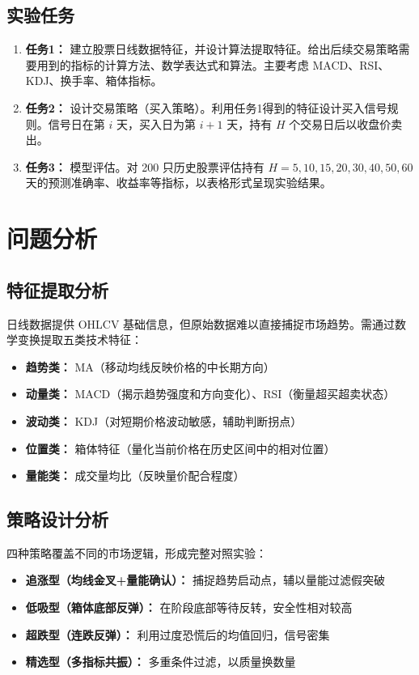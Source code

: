 \documentclass[12pt,a4paper]{ctexart}
\numberwithin{figure}{section}
\numberwithin{table}{section}
\begin{document}
\subsection{实验任务}
\begin{enumerate}[leftmargin=*]
    \item {\bfseries 任务1：} 建立股票日线数据特征，并设计算法提取特征。给出后续交易策略需要用到的指标的计算方法、数学表达式和算法。主要考虑 MACD、RSI、KDJ、换手率、箱体指标。
    \item {\bfseries 任务2：} 设计交易策略（买入策略）。利用任务1得到的特征设计买入信号规则。信号日在第 $i$ 天，买入日为第 $i+1$ 天，持有 $H$ 个交易日后以收盘价卖出。
    \item {\bfseries 任务3：} 模型评估。对 200 只历史股票评估持有 $H=5,10,15,20,30,40,50,60$ 天的预测准确率、收益率等指标，以表格形式呈现实验结果。
\end{enumerate}

\section{问题分析}

\subsection{特征提取分析}
日线数据提供 OHLCV 基础信息，但原始数据难以直接捕捉市场趋势。需通过数学变换提取五类技术特征：
\begin{itemize}[leftmargin=*]
    \item {\bfseries 趋势类：} MA（移动均线反映价格的中长期方向）
    \item {\bfseries 动量类：} MACD（揭示趋势强度和方向变化）、RSI（衡量超买超卖状态）
    \item {\bfseries 波动类：} KDJ（对短期价格波动敏感，辅助判断拐点）
    \item {\bfseries 位置类：} 箱体特征（量化当前价格在历史区间中的相对位置）
    \item {\bfseries 量能类：} 成交量均比（反映量价配合程度）
\end{itemize}

\subsection{策略设计分析}
四种策略覆盖不同的市场逻辑，形成完整对照实验：
\begin{itemize}[leftmargin=*]
    \item {\bfseries 追涨型（均线金叉+量能确认）：} 捕捉趋势启动点，辅以量能过滤假突破
    \item {\bfseries 低吸型（箱体底部反弹）：} 在阶段底部等待反转，安全性相对较高
    \item {\bfseries 超跌型（连跌反弹）：} 利用过度恐慌后的均值回归，信号密集
    \item {\bfseries 精选型（多指标共振）：} 多重条件过滤，以质量换数量
\end{itemize}
\end{document}
